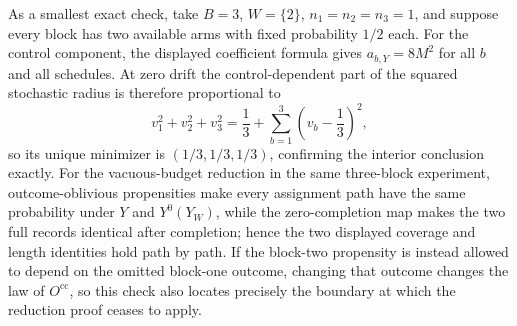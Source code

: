 As a smallest exact check, take \(B=3\), \(W=\{2\}\), \(n_1=n_2=n_3=1\), and suppose every block has two available arms with fixed probability \(1/2\) each.  For the control component, the displayed coefficient formula gives \(a_{b,Y}=8M^2\) for all \(b\) and all schedules.  At zero drift the control-dependent part of the squared stochastic radius is therefore proportional to
\[
 v_1^2+v_2^2+v_3^2
 =\frac13+\sum_{b=1}^3\left(v_b-\frac13\right)^2,
\]
so its unique minimizer is \((1/3,1/3,1/3)\), confirming the interior conclusion exactly.  For the vacuous-budget reduction in the same three-block experiment, outcome-oblivious propensities make every assignment path have the same probability under \(Y\) and \(Y^0(Y_W)\), while the zero-completion map makes the two full records identical after completion; hence the two displayed coverage and length identities hold path by path.  If the block-two propensity is instead allowed to depend on the omitted block-one outcome, changing that outcome changes the law of \(O^{\mathrm{cc}}\), so this check also locates precisely the boundary at which the reduction proof ceases to apply.
